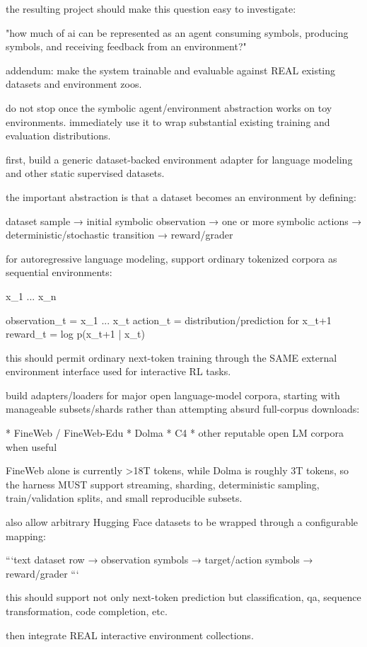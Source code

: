 the resulting project should make this question easy to investigate:

"how much of ai can be represented as an agent consuming symbols, producing symbols, and receiving feedback from an environment?"

addendum: make the system trainable and evaluable against REAL existing datasets and environment zoos.

do not stop once the symbolic agent/environment abstraction works on toy environments. immediately use it to wrap substantial existing training and evaluation distributions.

first, build a generic dataset-backed environment adapter for language modeling and other static supervised datasets.

the important abstraction is that a dataset becomes an environment by defining:

dataset sample
→ initial symbolic observation
→ one or more symbolic actions
→ deterministic/stochastic transition
→ reward/grader

for autoregressive language modeling, support ordinary tokenized corpora as sequential environments:

x_1 ... x_n

observation_t = x_1 ... x_t
action_t = distribution/prediction for x_{t+1}
reward_t = log p(x_{t+1} | x_{\le t})

this should permit ordinary next-token training through the SAME external environment interface used for interactive RL tasks.

build adapters/loaders for major open language-model corpora, starting with manageable subsets/shards rather than attempting absurd full-corpus downloads:

* FineWeb / FineWeb-Edu
* Dolma
* C4
* other reputable open LM corpora when useful

FineWeb alone is currently >18T tokens, while Dolma is roughly 3T tokens, so the harness MUST support streaming, sharding, deterministic sampling, train/validation splits, and small reproducible subsets.

also allow arbitrary Hugging Face datasets to be wrapped through a configurable mapping:

```text
dataset row
→ observation symbols
→ target/action symbols
→ reward/grader
```

this should support not only next-token prediction but classification, qa, sequence transformation, code completion, etc.

then integrate REAL interactive environment collections.


